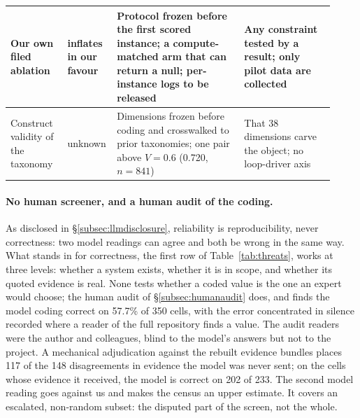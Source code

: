 \begin{table}[tp]
\begin{tabular}{@{}p{0.17\linewidth}p{0.10\linewidth}p{0.38\linewidth}p{0.27\linewidth}@{}}
\addlinespace[2pt]
\raggedright Our own filed ablation & \raggedright inflates in our favour &
\raggedright Protocol frozen before the first scored instance; a compute-matched arm that can return a null;
per-instance logs to be released &
\raggedright Any constraint tested by a result; only pilot data are collected \tabularnewline
\midrule
\raggedright Construct validity of the taxonomy & \raggedright unknown &
\raggedright Dimensions frozen before coding and crosswalked to prior taxonomies; one pair above $V = 0.6$
(0.720, $n = 841$) &
\raggedright That 38 dimensions carve the object; no loop-driver axis \tabularnewline
\bottomrule
\end{tabular}
\end{table}

\paragraph{No human screener, and a human audit of the coding.}
\label{subsec:nohuman}
\label{subsec:repro}
As disclosed in \S\ref{subsec:llmdisclosure}, reliability is reproducibility, never correctness: two model readings can agree and both be
wrong in the same way. What stands in for correctness, the first row of Table~\ref{tab:threats}, works at
three levels: whether a system exists, whether it is in scope, and whether its quoted evidence is real.
None tests whether a coded value is the one an expert would choose; the human audit of
\S\ref{subsec:humanaudit} does, and finds the model coding correct on 57.7\% of 350 cells, with the
error concentrated in silence recorded where a reader of the full repository finds a value. The audit
readers were the author and colleagues, blind to the model's answers but not to the project. A
mechanical adjudication against the rebuilt evidence bundles places 117 of the 148 disagreements in
evidence the model was never sent; on the cells whose evidence it received, the model is correct on 202
of 233. The second model reading
goes against us and makes the census an upper estimate. It covers an escalated, non-random subset:
the disputed part of the screen, not the whole.

